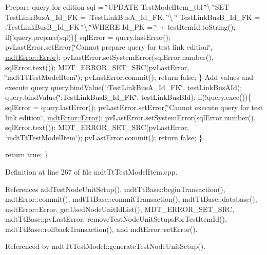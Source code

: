 Prepare query for edition sql = \char`\"{}\-U\-P\-D\-A\-T\-E Test\-Model\-Item\-\_\-tbl \char`\"{}\textbackslash{} \char`\"{}\-S\-E\-T Test\-Link\-Bus\-A\-\_\-\-Id\-\_\-\-F\-K = \-:\-Test\-Link\-Bus\-A\-\_\-\-Id\-\_\-\-F\-K, \char`\"{}\textbackslash{} \char`\"{}    Test\-Link\-Bus\-B\-\_\-\-Id\-\_\-\-F\-K = \-:\-Test\-Link\-Bus\-B\-\_\-\-Id\-\_\-\-F\-K \char`\"{}\textbackslash{} \char`\"{}\-W\-H\-E\-R\-E Id\-\_\-\-P\-K = \char`\"{} + test\-Item\-Id.\-to\-String(); if(!query.prepare(sql))\{ sql\-Error = query.\-last\-Error(); pv\-Last\-Error.\-set\-Error(\char`\"{}\-Cannot prepare query for test link edition\char`\"{}, \hyperlink{classmdt_error_a5c8b1a040e2feaa848f6201d6b6f0cd7a35f5c05a7d15b6433445cdbffa6d5260}{mdt\-Error\-::\-Error}); pv\-Last\-Error.\-set\-System\-Error(sql\-Error.\-number(), sql\-Error.\-text()); M\-D\-T\-\_\-\-E\-R\-R\-O\-R\-\_\-\-S\-E\-T\-\_\-\-S\-R\-C(pv\-Last\-Error, \char`\"{}mdt\-Tt\-Test\-Model\-Item\char`\"{}); pv\-Last\-Error.\-commit(); return false; \} Add values and execute query query.\-bind\-Value(\char`\"{}\-:\-Test\-Link\-Bus\-A\-\_\-\-Id\-\_\-\-F\-K\char`\"{}, test\-Link\-Bus\-A\-Id); query.\-bind\-Value(\char`\"{}\-:\-Test\-Link\-Bus\-B\-\_\-\-Id\-\_\-\-F\-K\char`\"{}, test\-Link\-Bus\-B\-Id); if(!query.exec())\{ sql\-Error = query.\-last\-Error(); pv\-Last\-Error.\-set\-Error(\char`\"{}\-Cannot execute query for test link edition\char`\"{}, \hyperlink{classmdt_error_a5c8b1a040e2feaa848f6201d6b6f0cd7a35f5c05a7d15b6433445cdbffa6d5260}{mdt\-Error\-::\-Error}); pv\-Last\-Error.\-set\-System\-Error(sql\-Error.\-number(), sql\-Error.\-text()); M\-D\-T\-\_\-\-E\-R\-R\-O\-R\-\_\-\-S\-E\-T\-\_\-\-S\-R\-C(pv\-Last\-Error, \char`\"{}mdt\-Tt\-Test\-Model\-Item\char`\"{}); pv\-Last\-Error.\-commit(); return false; \}

return true; \} 

Definition at line 267 of file mdt\-Tt\-Test\-Model\-Item.\-cpp.



References add\-Test\-Node\-Unit\-Setup(), mdt\-Tt\-Base\-::begin\-Transaction(), mdt\-Error\-::commit(), mdt\-Tt\-Base\-::commit\-Transaction(), mdt\-Tt\-Base\-::database(), mdt\-Error\-::\-Error, get\-Used\-Node\-Unit\-Id\-List(), M\-D\-T\-\_\-\-E\-R\-R\-O\-R\-\_\-\-S\-E\-T\-\_\-\-S\-R\-C, mdt\-Tt\-Base\-::pv\-Last\-Error, remove\-Test\-Node\-Unit\-Setups\-For\-Test\-Item\-Id(), mdt\-Tt\-Base\-::rollback\-Transaction(), and mdt\-Error\-::set\-Error().



Referenced by mdt\-Tt\-Test\-Model\-::generate\-Test\-Node\-Unit\-Setup().


